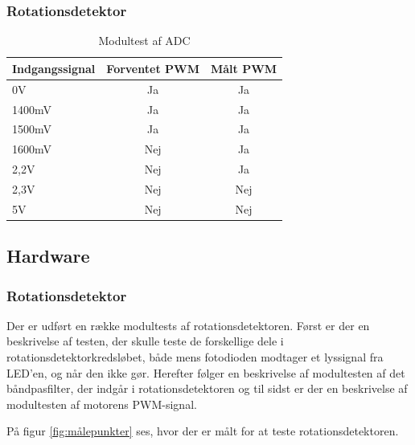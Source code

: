 \subsubsection{Rotationsdetektor}
\begin{table}[H]
	\centering
	\begin{tabular}{|l|c|c|}
		\hline
		\textbf{Indgangssignal} & \textbf{Forventet PWM} & \textbf{Målt PWM} \\ \hline
		0V                      & Ja                     & Ja                \\ \hline
		1400mV                  & Ja                     & Ja                \\ \hline
		1500mV                  & Ja                     & Ja                \\ \hline
		1600mV                  & Nej                    & Ja                \\ \hline
		2,2V                    & Nej                    & Ja                \\ \hline
		2,3V                    & Nej                    & Nej               \\ \hline
		5V                      & Nej                    & Nej               \\ \hline
	\end{tabular}
	\caption{Modultest af ADC}
	\label{my-label}
\end{table}

\subsection{Hardware}

\subsubsection{Rotationsdetektor}
Der er udført en række modultests af rotationsdetektoren. Først er der en beskrivelse af testen, der skulle teste de forskellige dele i rotationsdetektorkredsløbet, både mens fotodioden modtager et lyssignal fra LED'en, og når den ikke gør. Herefter følger en beskrivelse af modultesten af det båndpasfilter, der indgår i rotationsdetektoren og til sidst er der en beskrivelse af modultesten af motorens PWM-signal. 

På figur \ref{fig:målepunkter} ses, hvor der er målt for at teste rotationsdetektoren. 

